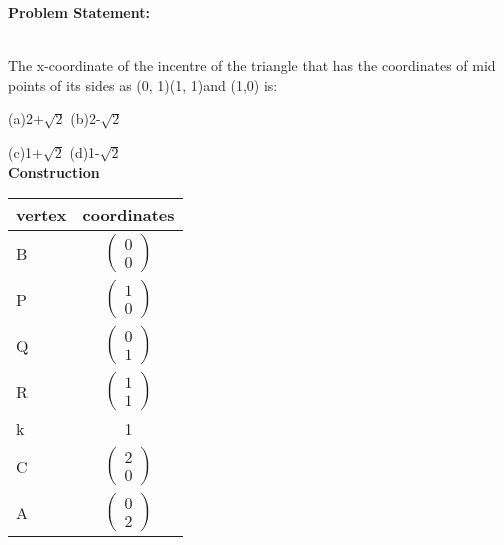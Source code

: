 \documentclass[10pt,a4paper]{report}
\begin{document}
\begin{multicols}{2}


\raggedright \textbf{Problem Statement:}\vspace{2mm}
\raggedright \\The x-coordinate of the incentre of the triangle that has the
coordinates of mid points of its sides as (0, 1)(1, 1)and (1,0) is:

(a)2+$\sqrt{2}$  \hspace{2cm} (b)2-$\sqrt{2}$ 

(c)1+$\sqrt{2}$ \hspace{2cm}  (d)1-$\sqrt{2}$\\
\vspace{5mm}
 \vspace{2mm} 
 \textbf{Construction}
\begin{center}
\setlength{\arrayrulewidth}{0.5mm}
\setlength{\tabcolsep}{6pt}
\renewcommand{\arraystretch}{1.5}
    \begin{tabular}{|l|c|}
    \hline 
    \textbf{vertex} & \textbf{coordinates} \\ \hline
   B & $ \begin{pmatrix} 
0 \\
0
\end{pmatrix} $ \\ \hline
   P & $ \begin{pmatrix} 
1 \\
0
\end{pmatrix} $ \\ \hline  
   Q & $ \begin{pmatrix} 
0 \\
1
\end{pmatrix} $ \\ \hline
   R & $ \begin{pmatrix} 
1\\
1
\end{pmatrix} $ \\ \hline
k&1\\   \hline
	C & $ \begin{pmatrix} 
2\\
0
\end{pmatrix} $ \\
 \hline
	A & $ \begin{pmatrix} 
0\\
2
\end{pmatrix} $ \\
\hline
      \end{tabular}
  \end{center}


\end{multicols}
\end{document}
